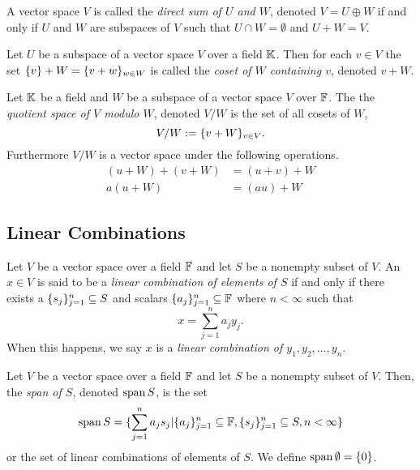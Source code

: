 \begin{definition}
	A vector space $V$ is called the \textit{direct sum of $U$ and $W$}, denoted $V=U\oplus W$ if and only if $U$ and $W$ are subspaces of $V$ such that $U\cap W=\emptyset$ and $U+W=V$.
\end{definition}

\begin{definition}
	Let $U$ be a subspace of a vector space $V$ over a field $\mathbb{K}$.
	Then for each $v\in V$ the set $\lbrace v \rbrace+W=\lbrace v+w \rbrace_{w\in W}$ is called the \textit{coset of $W$ containing $v$}, denoted $v+W$.
\end{definition}

\begin{definition}
	Let $\mathbb{K}$ be a field and $W$ be a subspace of a vector space $V$ over $\mathbb{F}$.
	The the \textit{quotient space of $V$ modulo $W$}, denoted $V/W$ is the set of all cosets of $W$,
	\[
		V/W := \lbrace v+W \rbrace_{v\in V}.
	\]
	Furthermore $V/W$ is a vector space under the following operations.
	\begin{align*}
		(u+W)+(v+W)&=(u+v)+W\\
		a(u+W)&=(au)+W
	\end{align*}
\end{definition}

\pagebreak

\subsection{Linear Combinations}

\begin{definition}
	Let $V$ be a vector space over a field $\mathbb{F}$ and let $S$ be a nonempty subset of $V$.
	An $x\in V$ is said to be a \textit{linear combination of elements of $S$} if and only if there exists a $\lbrace s_j \rbrace_{j=1}^n\subseteq S$ and scalars $\lbrace a_j \rbrace_{j=1}^n\subseteq\mathbb{F}$ where $n < \infty$ such that
	\[
		x=\sum_{j=1}^n a_j y_j.
	\]
	When this happens, we say $x$ is a \textit{linear combination of $y_1,y_2,\ldots, y_n$}.
\end{definition}

\begin{definition}
	Let $V$ be a vector space over a field $\mathbb{F}$ and let $S$ be a nonempty subset of $V$.
	Then, the \textit{span of $S$}, denoted $\operatorname{span} S$, is the set
	\[
		\operatorname{span} S = \lbrace \sum_{j=1}^n a_j s_j | \lbrace a_j \rbrace_{j=1}^n\subseteq\mathbb{F}, \lbrace s_j \rbrace_{j=1}^n\subseteq S, n<\infty \rbrace
	\]
	or the set of linear combinations of elements of $S$.
	We define $\operatorname{span}\emptyset = \lbrace 0 \rbrace$.
\end{definition}


